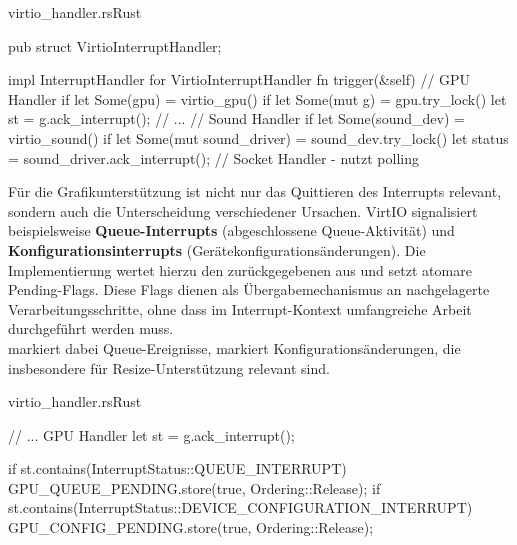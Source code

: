 \begin{codeblock}{virtio\_handler.rs}{Rust}
  \begin{rustcode}
pub struct VirtioInterruptHandler;

impl InterruptHandler for VirtioInterruptHandler {
    fn trigger(&self) {
        // GPU Handler
        if let Some(gpu) = virtio_gpu() {
            if let Some(mut g) = gpu.try_lock() {
                let st = g.ack_interrupt();
                // ...
            }
        }
        // Sound Handler
        if let Some(sound_dev) = virtio_sound() {
            if let Some(mut sound_driver) = sound_dev.try_lock() {
                let status = sound_driver.ack_interrupt();
            }
        }
        // Socket Handler - nutzt polling
    }
}
  \end{rustcode}
\end{codeblock}

Für die Grafikunterstützung ist nicht nur das Quittieren des Interrupts relevant, sondern auch die Unterscheidung verschiedener Ursachen. VirtIO signalisiert beispielsweise \textbf{Queue-Interrupts} (abgeschlossene Queue-Aktivität) und \textbf{Konfigurationsinterrupts} (Gerätekonfigurationsänderungen). Die Implementierung wertet hierzu den zurückgegebenen  aus und setzt atomare Pending-Flags. Diese Flags dienen als Übergabemechanismus an nachgelagerte Verarbeitungsschritte, ohne dass im Interrupt-Kontext umfangreiche Arbeit durchgeführt werden muss.\\
 markiert dabei Queue-Ereignisse,  markiert Konfigurationsänderungen, die insbesondere für Resize-Unterstützung relevant sind.

\begin{codeblock}{virtio\_handler.rs}{Rust}
  \begin{rustcode}
// ... GPU Handler
let st = g.ack_interrupt();

if st.contains(InterruptStatus::QUEUE_INTERRUPT) {
    GPU_QUEUE_PENDING.store(true, Ordering::Release);
}
if st.contains(InterruptStatus::DEVICE_CONFIGURATION_INTERRUPT) {
    GPU_CONFIG_PENDING.store(true, Ordering::Release);
}
  \end{rustcode}
\end{codeblock}

